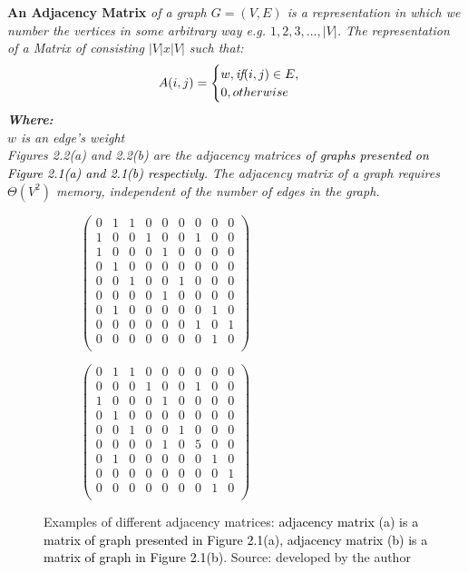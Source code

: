\newline
\begin{definition} \textbf{An Adjacency Matrix } \emph{of a graph $G=(V, E)$ is a representation in which we number the vertices in some arbitrary way e.g. $1,2,3,\dots, |V|$. The representation of a Matrix of
consisting $|V|x|V|$ such that: 
$$A(i,j)=
\begin{cases}
w, \emph{if}  (i,j)\in E,\\
0, otherwise\\
\end{cases}$$
\textbf{Where:}\\
$w$ is an edge's weight \\
\newline
}
\emph{Figures 2.2(a) and 2.2(b) are the adjacency matrices of \textcolor{black}{graphs presented on Figure 2.1(a) and 2.1(b) respectivly}.
The adjacency matrix of a graph requires $\varTheta(V^2)$ memory, independent of the number of edges in the graph.}
\end{definition}
\begin{figure}[!h]
	\centering
	\begin{subfigure}{.35\textwidth}
	  \centering
	  $\begin{pmatrix}
		0&1&1&0&0&0&0&0&0\\
		1&0&0&1&0&0&1&0&0\\
		1&0&0&0&1&0&0&0&0\\
		0&1&0&0&0&0&0&0&0\\
		0&0&1&0&0&1&0&0&0\\
		0&0&0&0&1&0&0&0&0\\
		0&1&0&0&0&0&0&1&0\\
		0&0&0&0&0&0&1&0&1\\
		0&0&0&0&0&0&0&1&0\\
	\end{pmatrix}$
	  \caption{}
	  \label{fig:sub1}
	\end{subfigure}
	\begin{subfigure}{.35\textwidth}
	  \centering
	  $\begin{pmatrix}
		0&1&1&0&0&0&0&0&0\\
		0&0&0&1&0&0&1&0&0\\
		1&0&0&0&1&0&0&0&0\\
		0&1&0&0&0&0&0&0&0\\
		0&0&1&0&0&1&0&0&0\\
		0&0&0&0&1&0&5&0&0\\
		0&1&0&0&0&0&0&1&0\\
		0&0&0&0&0&0&0&0&1\\
		0&0&0&0&0&0&0&1&0\\
	\end{pmatrix}$
	  \caption{}
	  \label{fig:sub2}
	\end{subfigure}
	\caption{Examples of different adjacency matrices: \textcolor{black}{adjacency matrix (a) is a matrix of graph presented in Figure 2.1(a), adjacency matrix (b) is a matrix of graph in Figure 2.1(b)}. Source: developed by the author }
	\label{fig:test}
\end{figure}

